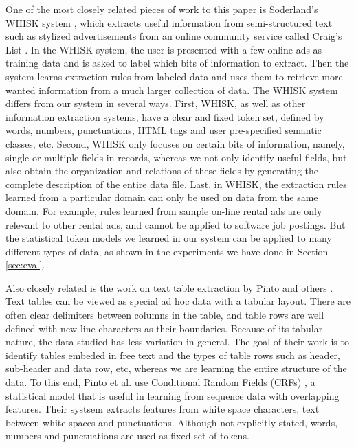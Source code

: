 One of the most closely related pieces of work to this paper is Soderland's WHISK
system \cite{soderland:whisk}, which extracts useful information from
semi-structured text such as stylized advertisements from an online community
service called Craig's List \cite{craigslist}.
In the WHISK system, the user is presented with a few online ads as training data 
and is asked to label which bits of information to extract. Then the system learns
extraction rules from labeled data and uses them to retrieve more wanted
information from a much larger collection of data. 
The WHISK system differs from our system in several ways. 
First, WHISK, as well as other information extraction systems,
have a clear and fixed token set, defined by words, numbers, punctuations, 
HTML tags and user pre-specified semantic classes, etc. 
Second, WHISK only focuses on certain bits of
information, namely, single or multiple fields in records, 
whereas we not only identify useful fields, but also obtain the 
organization and relations of these fields by generating the complete 
description of the entire data file. 
Last, in WHISK, the extraction rules learned from a particular domain can only
be used on data from the same domain. For example, rules learned from
sample on-line rental
ads are only relevant to other rental ads, and cannot be applied to
software job postings. But the statistical token models we learned in our system can be
applied to many different types of data, as shown in the experiments we
have done in Section \ref{sec:eval}.  


Also closely related is the work on text table extraction by
Pinto and others \cite{Pinto+:texttables}. Text tables can
be viewed as special ad hoc data with a tabular layout. There are
often clear delimiters between columns in the table, and table rows
are well defined with new line characters as their boundaries.
Because of its tabular nature, the data studied has less variation in general. 
The goal of their work  
is to identify tables embeded in free text and the types of table rows 
such as header, sub-header and data row, etc, whereas we are learning the entire
structure of the data. 
To this end, Pinto et al. use Conditional Random Fields (CRFs) 
\cite{LaffertyMP01:CRF},
a statistical model that is useful in learning from sequence data with 
overlapping features.
Their systsem extracts features from white space characters,
text between white spaces and punctuations. Although not explicitly
stated, words, numbers and punctuations are used as fixed set of tokens. 
 
